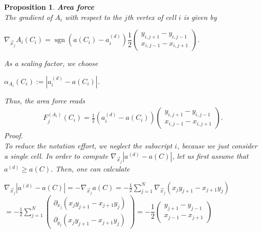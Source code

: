 \documentclass[a4paper,12pt,leqno]{article}
\theoremstyle{plain}
\newtheorem{proposition}[theorem]{Proposition}
\theoremstyle{remark}
\DeclareMathOperator{\sgn}{sgn}
\begin{document}
\begin{proposition} \textbf{Area force} \\
	The gradient of $A_i$ with respect to the $j$th vertex of cell $i$ is given by 
	\begin{center}
		$\nabla_{\vec{x}_j} A_i(C_i) = \sgn(a(C_i) - a_i^{(d)}) \dfrac{1}{2} \begin{pmatrix} y_{i,j+1} - y_{i,j-1} \\ x_{i,j-1} - x_{i,j+1} \end{pmatrix}$. 
	\end{center}
	As a scaling factor, we choose
	\begin{center}
		$\alpha_{A_i}(C_i) := | a_i^{(d)} - a(C_i) |$. 
	\end{center}
	Thus, the area force reads 
	\begin{align}
		F_{j}^{(A_i)}(C_i) = \frac{1}{2}( a_i^{(d)} - a(C_i)) \begin{pmatrix} y_{i,j+1} - y_{i,j-1} \\ x_{i,j-1} - x_{i,j+1} \end{pmatrix}.
	\end{align}
	Proof.\\
	To reduce the notation effort, we neglect the subscript $i$, because we just consider a single cell.
	In order to compute $\nabla_{\vec{x}_j} | a^{(d)} - a(C) |$, let us first assume that $a^{(d)} \geq a(C)$. Then, one can calculate
	\begin{center}
		$
		\nabla_{\vec{x}_j} | a^{(d)} - a(C) | = - \nabla_{\vec{x}_j} a(C)
		= - \frac{1}{2}\sum\limits_{j = 1}^{N} \nabla_{\vec{x}_j} (x_{j} y_{j+1} - x_{j+1} y_{j})$ \\ \smallskip 
		$=- \frac{1}{2}\sum\limits_{j = 1}^{N} \begin{pmatrix} \partial_{x_j}  (x_{j} y_{j+1} - x_{j+1} y_{j})\\ \partial_{y_j} (x_{j} y_{j+1} - x_{j+1} y_{j})\end{pmatrix} 
		= - \dfrac{1}{2} \begin{pmatrix} y_{j+1} - y_{j-1} \\ x_{j-1} - x_{j+1} \end{pmatrix}
		$
	\end{center}
	

\end{proposition}
\end{document}
